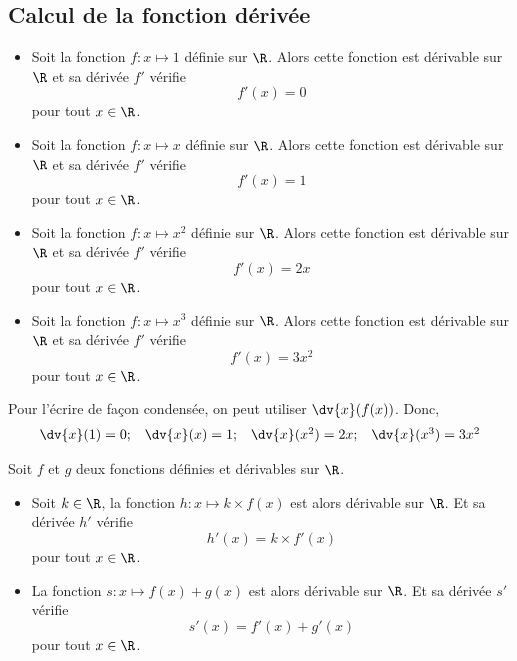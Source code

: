 \documentclass{article}
\begin{document}
\subsection{Calcul de la fonction dérivée}
\begin{proposition}
\begin{itemize}
\item Soit la fonction $f \colon x \mapsto 1$ définie sur $\R$. Alors cette fonction est dérivable sur $\R$ et sa dérivée $f'$ vérifie
\begin{equation*}
f'(x)=0
\end{equation*}
pour tout $x \in \R$.
\item Soit la fonction $f \colon x \mapsto x$ définie sur $\R$. Alors cette fonction est dérivable sur $\R$ et sa dérivée $f'$ vérifie
\begin{equation*}
f'(x)=1
\end{equation*}
pour tout $x \in \R$.
\item Soit la fonction $f \colon x \mapsto x^2$ définie sur $\R$. Alors cette fonction est dérivable sur $\R$ et sa dérivée $f'$ vérifie
\begin{equation*}
f'(x)=2x
\end{equation*}
pour tout $x \in \R$.
\item Soit la fonction $f \colon x \mapsto x^3$ définie sur $\R$. Alors cette fonction est dérivable sur $\R$ et sa dérivée $f'$ vérifie
\begin{equation*}
f'(x)=3x^2
\end{equation*}
pour tout $x \in \R$.
\end{itemize}
\end{proposition}
\begin{tcolorbox}
\begin{remark}
Pour l'écrire de façon condensée, on peut utiliser $\dv{x}(f(x))$. Donc,
\begin{equation*}
\begin{array}{cccc}
\dv{x}(1)=0; & \dv{x}(x)=1; & \dv{x}(x^2)=2x; & \dv{x}(x^3) = 3x^2
\end{array}
\end{equation*}
\end{remark}
\end{tcolorbox}
\begin{proposition}
Soit $f$ et $g$ deux fonctions définies et dérivables sur $\R$.
\begin{itemize}
\item Soit $k \in \R$, la fonction $h \colon x \mapsto k \times f(x)$ est alors dérivable sur $\R$. Et sa dérivée $h'$ vérifie
\begin{equation*}
h'(x) = k \times f'(x)
\end{equation*}
pour tout $x \in \R$.
\item La fonction $s \colon x \mapsto f(x) + g(x)$ est alors dérivable sur $\R$. Et sa dérivée $s'$ vérifie
\begin{equation*}
s'(x) = f'(x) + g'(x)
\end{equation*}
pour tout $x \in \R$.
\end{itemize}
\end{proposition}
\end{document}
